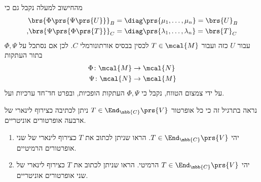\documentclass[a4paper,10pt,twoside,openany]{book}
\begin{document}
\begin{exercisechap}
\begin{solution}
\begin{enumerate}
מהחישוב למעלה נקבל גם כי
\begin{align*}
\brs{\Phi\prs{\Psi\prs{U}}}_B &= \diag\prs{\mu_1, \ldots, \mu_n} = \brs{U}_B \\
\text{,} \brs{\Psi \prs{\Phi\prs{T}}}_C &= \diag\prs{\lambda_1, \ldots, \lambda_n} = \brs{T}_C 
\end{align*}
עבור
$U$
כזה ועבור
$T \in \mcal{M}$
לכסין בבסיס אורתונורמלי
$C$.
לכן אם נסתכל על
$\Phi, \Psi$
בתור העתקות
\begin{align*}
\Phi \colon \mcal{M} &\to \mcal{N} \\
\Psi \colon \mcal{N} &\to \mcal{M}
\end{align*}
על ידי צמצום הטווח, נקבל כי
$\Phi, \Psi$
העתקות הופכיות, ובפרט חד־חד ערכיות ועל.

\end{enumerate}
\end{solution}

\end{exercisechap}

\begin{exercisechap}
נראה בתרגיל זה כי כל אופרטור
$T \in \End_{\mbb{C}}\prs{V}$
ניתן לכתיבה כצירוף לינארי של ארבעה אופרטורים אוניטריים.

\begin{enumerate}
    \item יהי
    $T \in \End_{\mbb{C}}\prs{V}$.
    הראו שניתן לכתוב את
    $T$
    כצירוף לינארי של שני אופרטורים הרמיטיים.
    \item יהי
    $T \in \End_{\mbb{C}}\prs{V}$
    הרמיטי. הראו שניתן לכתוב את
    $T$
    כצירוף לינארי של שני אופרטורים אוניטריים.
\end{enumerate}
\end{exercisechap}
\end{document}
